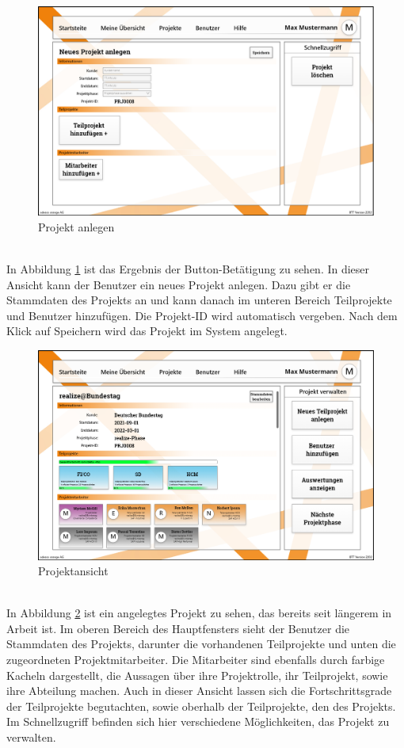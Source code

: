\begin{figure}[h!]
    \centering
    \includegraphics[scale=0.35]{./Prototyp/042_Projekt bearbeiten.png}
    \caption[Prototyp: Projekt anlegen]{Projekt anlegen}
    \label{fig:ProjektAnlegen}
\end{figure}
\\In Abbildung \ref{fig:ProjektAnlegen} ist das Ergebnis der Button-Betätigung zu sehen. In dieser Ansicht kann der Benutzer ein neues Projekt anlegen. Dazu gibt er die Stammdaten des Projekts an und kann danach im unteren Bereich Teilprojekte und Benutzer hinzufügen. Die Projekt-ID wird automatisch vergeben. Nach dem Klick auf \glqq{}Speichern\grqq{} wird das Projekt im System angelegt. 
\begin{figure}[h!]
    \centering
    \includegraphics[scale=0.35]{./Prototyp/041_Projekt Ansicht.png}
    \caption[Prototyp: Projektansicht]{Projektansicht}
    \label{fig:Projektansicht}
\end{figure}
\\In Abbildung \ref{fig:Projektansicht} ist ein angelegtes Projekt zu sehen, das bereits seit längerem in Arbeit ist. Im oberen Bereich des Hauptfensters sieht der Benutzer die Stammdaten des Projekts, darunter die vorhandenen Teilprojekte und unten die zugeordneten Projektmitarbeiter. Die Mitarbeiter sind ebenfalls durch farbige Kacheln dargestellt, die Aussagen über ihre Projektrolle, ihr Teilprojekt, sowie ihre Abteilung machen. Auch in dieser Ansicht lassen sich die Fortschrittsgrade der Teilprojekte begutachten, sowie oberhalb der Teilprojekte, den des Projekts. Im Schnellzugriff befinden sich hier verschiedene Möglichkeiten, das Projekt zu verwalten.
